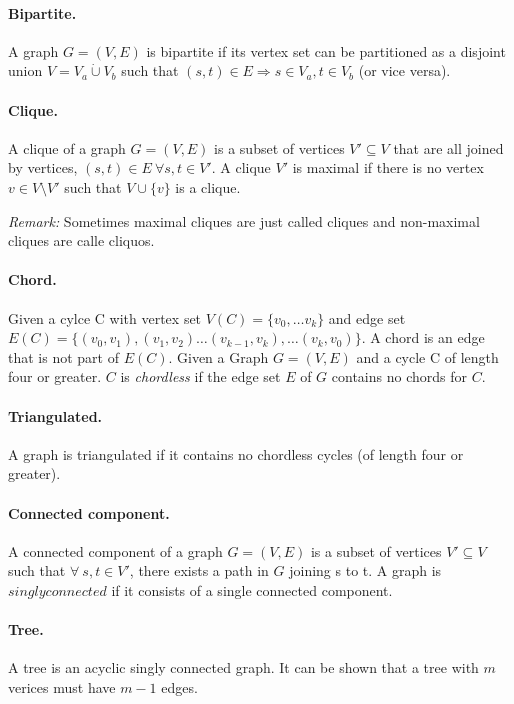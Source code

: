 \paragraph*{Bipartite.} A graph $G=(V,E)$ is bipartite if its vertex set can be partitioned as a disjoint union $V = V_a \dot \cup V_b$ such that $(s,t) \in E \Rightarrow s \in V_a, t \in V_b $ (or vice versa).
\paragraph*{Clique.} A clique of a graph $G=(V,E)$ is a subset of vertices $V'\subseteq V$  that are all joined by vertices, $(s,t) \in E ~ \forall s, t \in V'$. A clique $V'$ is maximal if there is no vertex $v \in V \setminus V'$ such that $V \cup \{v\}$ is a clique.

\textit{Remark:} Sometimes maximal cliques are just called cliques and non-maximal cliques are calle cliquos.
\paragraph*{Chord.} Given a cylce C with vertex set $V(C)=\{v_0, \dots v_k\}$  and edge set $E(C)=\{(v_0, v_1), (v_1,v_2) \dots(v_{k-1}, v_k), \dots(v_k, v_0) \}$. A chord is an edge that is not part  of $E(C)$. Given a Graph $G=(V,E)$ and a cycle C of length four or greater.  $C$ is \textit{chordless} if the edge set $E$ of $G$ contains no chords for $C$.
\paragraph*{Triangulated.} A graph is triangulated if it contains no chordless cycles (of length four or greater).
 
\paragraph*{Connected component.} A connected component of a graph $G=(V,E)$ is a subset of vertices $ V' \subseteq V$ such that $\forall ~ s, t \in V'$, there exists a path in  $G$ joining s to t. A graph is $singly connected$ if it consists of a single connected component.

\paragraph*{Tree.} A tree is an  acyclic singly connected graph. It can be shown that a tree with $m$ verices must have $m-1$ edges.  

